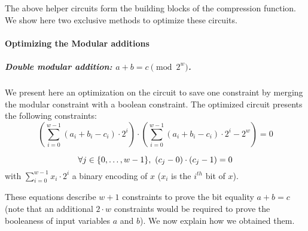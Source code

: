The above helper circuits form the building blocks of the  compression function. We show here two exclusive methods to optimize these circuits.

\paragraph{Optimizing the Modular additions}\label{implementation:efficiency:blake:optimization:mod-circuits}

\subparagraph{Double modular addition: {\boldmath $a + b = c \pmod {2^w}$}.}
We present here an optimization on the circuit to save one constraint by merging the modular constraint with a boolean constraint. The optimized circuit presents the following constraints:
\begin{equation}
  \label{implementation:eq:modular_to_prove}
  \left ( \sum_{i=0}^{w - 1} ( a_i + b_i - c_i ) \cdot 2^i \right ) \cdot \left ( \sum_{i=0}^{w - 1} ( a_i + b_i - c_i ) \cdot 2^i - 2^{w} \right ) = 0
\end{equation}

\begin{equation}
  \label{implementation:eq:modular_bool_to_prove}
  \forall j \in \{{0},\ldots,{w - 1}\},\ (c_j - 0) \cdot (c_j - 1) = 0
\end{equation}
with $\sum_{i=0}^{w - 1} x_i \cdot 2^i$ a binary encoding of $x$ ($x_i$ is the $i^{th}$ bit of $x$).

These equations describe $w+1$ constraints to prove the bit equality $a + b = c$ (note that an additional $2\cdot w$ constraints would be required to prove the booleaness of input variables $a$ and $b$). We now explain how we obtained them.

